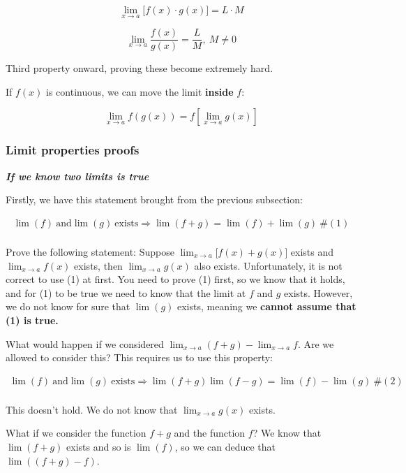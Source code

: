 \documentclass[
]{article}
\begin{document}
$$\lim_{x \rightarrow a}{\lbrack f(x) \cdot g(x)\rbrack = L \cdot M}$$

$$\lim_{x \rightarrow a}{\frac{f(x)}{g(x)} = \frac{L}{M}},\ M \neq 0$$

Third property onward, proving these become extremely hard.

If $f(x)$ is continuous, we can move the limit \textbf{inside} $f$:

$$\lim_{x \rightarrow a}{f\left( g(x) \right) = f\left\lbrack \lim_{x \rightarrow a}{g(x)} \right\rbrack}$$


\subsubsection{Limit properties proofs}

\emph{\textbf{If we know two limits is true}}

Firstly, we have this statement brought from the previous subsection:

$$\begin{matrix}
\lim(f)\ \text{and}\lim(g)\ \text{exists} \Rightarrow \lim(f + g) = \lim(f) + \lim(g)\ \#(1) \\
\end{matrix}$$

Prove the following statement: Suppose
$\lim_{x \rightarrow a}{\lbrack f(x) + g(x)\rbrack}$ exists and
$\lim_{x \rightarrow a}{f(x)}$ exists, then
$\lim_{x \rightarrow a}{g(x)}$ also exists. Unfortunately, it is not
correct to use (1) at first. You need to prove (1) first, so we know
that it holds, and for (1) to be true we need to know that the limit at
$f$ and $g$ exists. However, we do not know for sure that
$\lim(g)$ exists, meaning we \textbf{cannot assume that (1) is true.}

What would happen if we considered
$\lim_{x \rightarrow a}{(f + g)} - \lim_{x \rightarrow a}f$. Are we
allowed to consider this? This requires us to use this property:

$$\begin{matrix}
\lim(f)\ \text{and}\lim(g)\ \text{exists} \Rightarrow \lim(f + g)\lim(f - g) = \lim(f) - \lim(g)\ \#(2) \\
\end{matrix}$$

This doesn't hold. We do not know that $\lim_{x \rightarrow a}{g(x)}$
exists.

What if we consider the function $f + g$ and the function $f$? We
know that $\lim(f + g)$ exists and so is $\lim(f)$, so we can deduce
that $\lim\left( (f + g) - f \right)$.
\end{document}
